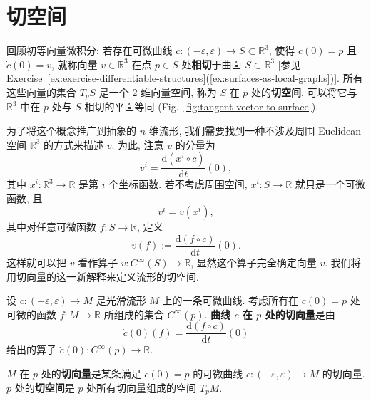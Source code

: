 \section{切空间}\label{sec:tangent-space}

回顾初等向量微积分: 若存在可微曲线 $c:(-\varepsilon,\varepsilon)\to S\subset\mathbb{R}^3$, 使得 $c(0)=p$ 且 $\dot c(0)=v$, 就称向量 $v\in\mathbb{R}^3$ 在点 $p\in S$ 处\textbf{相切}于曲面 $S\subset\mathbb{R}^3$ [参见 Exercise~\ref{ex:exercise-differentiable-structures}(\ref{ex:surfaces-as-local-graphs})]. 所有这些向量的集合 $T_pS$ 是一个 2 维向量空间, 称为 $S$ 在 $p$ 处的\textbf{切空间}, 可以将它与 $\mathbb{R}^3$ 中在 $p$ 处与 $S$ 相切的平面等同 (Fig.~\ref{fig:tangent-vector-to-surface}).

为了将这个概念推广到抽象的 $n$ 维流形, 我们需要找到一种不涉及周围 Euclidean 空间 $\mathbb{R}^3$ 的方式来描述 $v$. 为此, 注意 $v$ 的分量为
\[
  v^i=\frac{\mathrm{d}(x^i\circ c)}{\mathrm{d}t}(0),
\]
其中 $x^i:\mathbb{R}^3\to\mathbb{R}$ 是第 $i$ 个坐标函数. 若不考虑周围空间, $x^i:S\to\mathbb{R}$ 就只是一个可微函数, 且
\[
  v^i=v(x^i),
\]
其中对任意可微函数 $f:S\to\mathbb{R}$, 定义
\[
  v(f):=\frac{\mathrm{d}(f\circ c)}{\mathrm{d}t}(0).
\]
这样就可以把 $v$ 看作算子 $v:C^\infty(S)\to\mathbb{R}$, 显然这个算子完全确定向量 $v$. 我们将用切向量的这一新解释来定义流形的切空间.


\begin{RiemannDefinition}\label{def:tangent-vector-and-space}
设 $c:(-\varepsilon,\varepsilon)\to M$ 是光滑流形 $M$ 上的一条可微曲线. 考虑所有在 $c(0)=p$ 处可微的函数 $f:M\to\mathbb{R}$ 所组成的集合 $C^\infty(p)$. \textbf{曲线 $c$ 在 $p$ 处的切向量}是由
\[
  \dot c(0)(f)=\frac{\mathrm{d}(f\circ c)}{\mathrm{d}t}(0)
\]
给出的算子 $\dot c(0):C^\infty(p)\to\mathbb{R}$.

$M$ 在 $p$ 处的\textbf{切向量}是某条满足 $c(0)=p$ 的可微曲线 $c:(-\varepsilon,\varepsilon)\to M$ 的切向量. $p$ 处的\textbf{切空间}是 $p$ 处所有切向量组成的空间 $T_pM$.
\end{RiemannDefinition}

